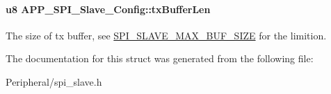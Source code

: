 \paragraph[{\texorpdfstring{tx\+Buffer\+Len}{txBufferLen}}]{\setlength{\rightskip}{0pt plus 5cm}u8 A\+P\+P\+\_\+\+S\+P\+I\+\_\+\+Slave\+\_\+\+Config\+::tx\+Buffer\+Len}\hypertarget{struct_a_p_p___s_p_i___slave___config_a6fbfdb577369d6b2e3b95184ed5baa6c}{}\label{struct_a_p_p___s_p_i___slave___config_a6fbfdb577369d6b2e3b95184ed5baa6c}
The size of tx buffer, see \hyperlink{group___s_p_i___s_l_a_v_e___m_a_x___b_u_f___s_i_z_e}{S\+P\+I\+\_\+\+S\+L\+A\+V\+E\+\_\+\+M\+A\+X\+\_\+\+B\+U\+F\+\_\+\+S\+I\+ZE} for the limition. 

The documentation for this struct was generated from the following file\+:\begin{DoxyCompactItemize}
\item 
Peripheral/spi\+\_\+slave.\+h\end{DoxyCompactItemize}
